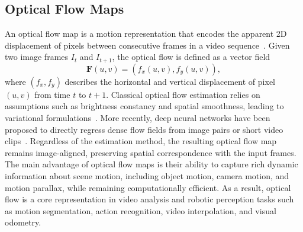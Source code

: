 \subsection{Optical Flow Maps}
\label{subsec:p-2-sec-4-2D-optical-flow-maps}
An optical flow map is a motion representation that encodes the apparent 2D displacement of pixels between consecutive frames in a video sequence~\cite{horn1981optical}. 
Given two image frames $I_t$ and $I_{t+1}$, the optical flow is defined as a vector field
\begin{equation}
\mathbf{F}(u,v) = (f_x(u,v), f_y(u,v)),
\end{equation}
where $(f_x, f_y)$ describes the horizontal and vertical displacement of pixel $(u,v)$ from time $t$ to $t+1$.
Classical optical flow estimation relies on assumptions such as
brightness constancy and spatial smoothness, leading to variational formulations~\cite{horn1981optical,brox2004high}. More recently, deep neural networks have been proposed to directly regress dense flow fields from image pairs or short video clips~\cite{dosovitskiy2015flownet,teed2020raft}.
Regardless of the estimation method, the resulting optical flow map remains image-aligned, preserving spatial correspondence with the input frames.
The main advantage of optical flow maps is their ability to capture rich dynamic information about scene motion, including object motion, camera motion, and motion parallax, while remaining computationally efficient.
As a result, optical flow is a core representation in video analysis and
robotic perception tasks such as motion segmentation, action
recognition, video interpolation, and visual odometry.




